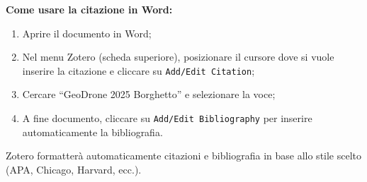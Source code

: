 \documentclass[9pt,a4paper,twocolumn,twoside]{tau-class/tau}
\begin{document}
\begin{tauenv}[frametitle=Citazione del report tecnico e dei dati associati]
\noindent
\textbf{Come usare la citazione in Word:}
\begin{enumerate}
  \item Aprire il documento in Word;
  \item Nel menu Zotero (scheda superiore), posizionare il cursore dove si vuole inserire la citazione e cliccare su \texttt{Add/Edit Citation};
  \item Cercare “GeoDrone 2025 Borghetto” e selezionare la voce;
  \item A fine documento, cliccare su \texttt{Add/Edit Bibliography} per inserire automaticamente la bibliografia.
\end{enumerate}

Zotero formatterà automaticamente citazioni e bibliografia in base allo stile scelto (APA, Chicago, Harvard, ecc.).
\end{tauenv}
\end{document}
